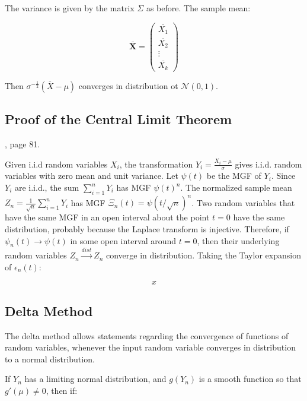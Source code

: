 The variance is given by the matrix $\Sigma$ as before. The sample mean:

\begin{equation}
\overline{\mathbf{X}} = \left(\begin{array}{c}\overline{X_{1}}\\ \overline{X_{2}} \\ \vdots \\ \overline{X_{k}} \end{array}\right)
\end{equation}

Then $\sigma^{-\frac{1}{2}} (\overline{X}-\mu)$ converges in distribution ot $\mathscr{N}(0,1)$.


\subsection{Proof of the Central Limit Theorem}
, page 81.

Given i.i.d random variables $X_i$, the transformation $Y_i = \frac{X_i-\mu}{\sigma}$ gives i.i.d. random variables with zero mean and unit variance. Let $\psi(t)$ be the MGF of $Y_i$. Since $Y_i$ are i.i.d., the sum $\sum_{i=1}^n Y_i$ has MGF $\psi(t)^n$. The normalized sample mean $Z_n = \frac{1}{\sqrt{n}}\sum_{i=1}^n Y_i$ has MGF $\Xi_n(t)=\psi(t/\sqrt{n})^n$. Two random variables that have the same MGF in an open interval about the point $t=0$ have the same distribution, probably because the Laplace transform is injective. Therefore, if $\psi_n(t)\rightarrow \psi(t)$ in some open interval around $t=0$, then their underlying random variables $Z_n \xrightarrow{dist}Z_n$ converge in distribution. Taking the Taylor expansion of $\epsilon_n(t)$:

\begin{equation}
x
\end{equation}


\subsection{Delta Method}

The delta method allows statements regarding the convergence of functions of random variables, whenever the input random variable converges in distribution to a normal distribution. 

If $Y_n$ has a limiting normal distribution, and $g(Y_n )$ is a smooth function so that $g'(\mu) \neq 0$, then if:


